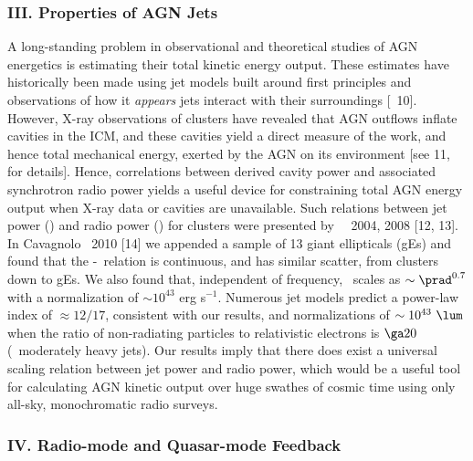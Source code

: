 \documentclass[letterpaper,12pt]{article}
\newcommand{\myhead}{Cavagnolo, Research Summary}
\begin{document}
\subsubsection*{III. Properties of AGN Jets}

A long-standing problem in observational and theoretical studies of
AGN energetics is estimating their total kinetic energy output. These
estimates have historically been made using jet models built around
first principles and observations of how it {\it{appears}} jets
interact with their surroundings [\eg\ 10]. However, X-ray
observations of clusters have revealed that AGN outflows inflate
cavities in the ICM, and these cavities yield a direct measure of the
work, and hence total mechanical energy, exerted by the AGN on its
environment [see 11, for details]. Hence, correlations between derived
cavity power and associated synchrotron radio power yields a useful
device for constraining total AGN energy output when X-ray data or
cavities are unavailable. Such relations between jet power (\pjet) and
radio power (\prad) for clusters were presented by
\birzan\ \etal\ 2004, 2008 [12, 13]. In Cavagnolo \etal\ 2010 [14] we
appended a sample of 13 giant ellipticals (gEs) and found that the
\pjet-\prad\ relation is continuous, and has similar scatter, from
clusters down to gEs. We also found that, independent of frequency,
\pjet\ scales as $\sim \prad^{0.7}$ with a normalization of $\sim
10^{43}$ erg s$^{-1}$. Numerous jet models predict a power-law index
of $\approx 12/17$, consistent with our results, and normalizations of
$\sim 10^{43} ~\lum$ when the ratio of non-radiating particles to
relativistic electrons is $\ga 20$ (\ie\ moderately heavy jets). Our
results imply that there does exist a universal scaling relation
between jet power and radio power, which would be a useful tool for
calculating AGN kinetic output over huge swathes of cosmic time using
only all-sky, monochromatic radio surveys.

\markright{\myhead}
\subsubsection*{IV. Radio-mode and Quasar-mode Feedback}
\end{document}
